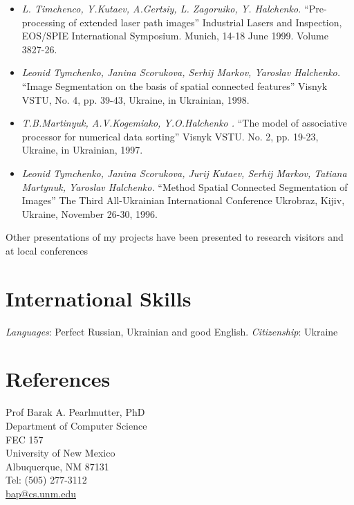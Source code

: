 \documentclass[10pt,overlapped,line]{res}
\newcommand{\mtitle}[1]{``#1''}
\newcommand{\mauthors}[1]{ \textit{#1.}}
\newcommand{\mwhere}[1]{#1.}
\begin{document}
\begin{resume}
\begin{itemize}
  \item 
    \mauthors{L. Timchenco, Y.Kutaev, A.Gertsiy, L. Zagoruiko, Y. Halchenko} 
    \mtitle{Pre-processing of extended laser path images} 
    \mwhere{Industrial Lasers and Inspection, EOS/SPIE International Symposium. Munich, 14-18 June 1999. Volume 3827-26}

  \item 
    \mauthors{Leonid Tymchenko, Janina Scorukova, Serhij Markov, Yaroslav Halchenko} 
    \mtitle{Image Segmentation on the basis of spatial connected features} 
    \mwhere{Visnyk VSTU, No. 4, pp. 39-43, Ukraine, in Ukrainian, 1998}

  \item 
    \mauthors{T.B.Martinyuk, A.V.Kogemiako, Y.O.Halchenko } 
    \mtitle{The model of associative processor for numerical data sorting} 
    \mwhere{ Visnyk VSTU. No. 2, pp. 19-23, Ukraine, in Ukrainian, 1997}

  \item 
    \mauthors{Leonid Tymchenko, Janina Scorukova, Jurij Kutaev, Serhij Markov, Tatiana Martynuk, Yaroslav Halchenko} 
    \mtitle{Method Spatial Connected Segmentation of Images}
    \mwhere{The Third All-Ukrainian International Conference Ukrobraz, Kijiv, Ukraine, November 26-30, 1996}
\end{itemize}

Other presentations of my projects have been presented to research visitors and at local conferences

\section{International Skills}
\emph{Languages}: Perfect Russian, Ukrainian and good English. 
\emph{Citizenship}: Ukraine

\section{References}
 \begin{multicols}{2}
{\small
   Prof Barak A. Pearlmutter, PhD \\
   Department of Computer Science \\
   FEC 157 \\
   University of New Mexico \\
   Albuquerque, NM  87131 \\
   Tel: (505) 277-3112  \\
   \href{URL}{bap@cs.unm.edu} \\

}
\end{multicols}
\end{resume}
\end{document}
